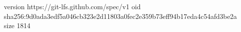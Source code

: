 version https://git-lfs.github.com/spec/v1
oid sha256:9d0ada3edf5a046cb323e2d11803a0fec2e359b73eff94b17eda4c54afd3be2a
size 1814
